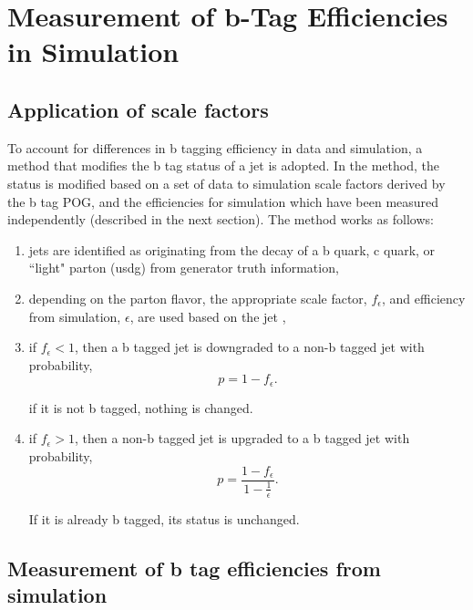 \section{Measurement of b-Tag Efficiencies in Simulation}


\subsection{Application of scale factors}

To account for differences in b tagging efficiency in data and
simulation, a method that modifies the b tag status of a jet is adopted.
In the method, the status is modified based on a set of data to
simulation scale factors derived by the b tag POG, and the efficiencies
for simulation which have been measured independently (described in the
next section).  The method works as follows:

\begin{enumerate}
    \item jets are identified as originating from the decay of a b
    quark, c quark, or ``light" parton (usdg) from generator truth information,
    \item depending on the parton flavor, the appropriate scale factor,
    $f_{\epsilon}$, and efficiency from simulation, $\epsilon$, are used
    based on the jet \pt,
    \item if $f_{\epsilon} < 1$, then a b tagged jet is downgraded to a
    non-b tagged jet with probability,
    \begin{equation}
        p = 1 - f_{\epsilon}.
    \end{equation}

    \noindent if it is not b tagged, nothing is changed.
    
    
    \item if $f_{\epsilon} > 1$, then a non-b tagged jet is upgraded to
    a b tagged jet with probability,
    \begin{equation}
        p = \frac{1 - f_{\epsilon}}{1 - \frac{1}{\epsilon}}.
    \end{equation}

    \noindent If it is already b tagged, its status is unchanged.
\end{enumerate}

\subsection{Measurement of b tag efficiencies from simulation}

